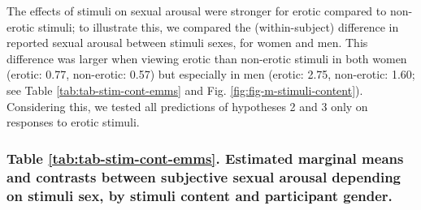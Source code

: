 \documentclass[
  bookmarksnumbered]{article}
\begin{document}
\begin{table}[H]
\centering
\caption{\label{tab:tab-m-stimuli-content}Effects of relationship type and gender on Dyadic TSD Partner}
\centering
{}
\end{table}

The effects of stimuli on sexual arousal were stronger for erotic compared to non-erotic stimuli; to illustrate this, we compared the (within-subject) difference in reported sexual arousal between stimuli sexes, for women and men. This difference was larger when viewing erotic than non-erotic stimuli in both women (erotic: 0.77, non-erotic: 0.57) but especially in men (erotic: 2.75, non-erotic: 1.60; see Table \ref{tab:tab-stim-cont-emms} and Fig. \ref{fig:fig-m-stimuli-content}). Considering this, we tested all predictions of hypotheses 2 and 3 only on responses to erotic stimuli.

\subsubsection{Table \ref{tab:tab-stim-cont-emms}. Estimated marginal means and contrasts between subjective sexual arousal depending on stimuli sex, by stimuli content and participant gender.}\label{table-reftabtab-stim-cont-emms.-estimated-marginal-means-and-contrasts-between-subjective-sexual-arousal-depending-on-stimuli-sex-by-stimuli-content-and-participant-gender.}
\end{document}

